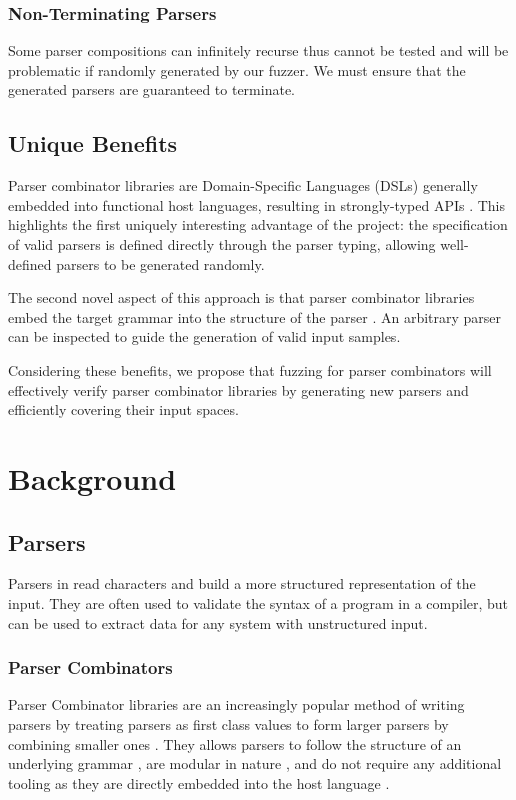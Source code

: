 \documentclass[11pt]{article}
\begin{document}
\subsubsection{Non-Terminating Parsers}
Some parser compositions can infinitely recurse thus cannot be tested and will be problematic if randomly generated by our fuzzer. We must ensure that the generated parsers are guaranteed to terminate.

\subsection{Unique Benefits}
Parser combinator libraries are Domain-Specific Languages (DSLs) generally embedded into functional host languages, resulting in strongly-typed APIs \cite{monadic-combinators, parsec}. This highlights the first uniquely interesting advantage of the project: the specification of valid parsers is defined directly through the parser typing, allowing well-defined parsers to be generated randomly.

The second novel aspect of this approach is that parser combinator libraries embed the target grammar into the structure of the parser \cite{combinator-parsing}. An arbitrary parser can be inspected to guide the generation of valid input samples.

Considering these benefits, we propose that fuzzing for parser combinators will effectively verify parser combinator libraries by generating new parsers and efficiently covering their input spaces.

\section{Background}

\subsection{Parsers}
Parsers in read characters and build a more structured representation of the input. They are often used to validate the syntax of a program in a compiler, but can be used to extract data for any system with unstructured input.

\subsubsection{Parser Combinators}
Parser Combinator libraries are an increasingly popular method of writing parsers by treating parsers as first class values to form larger parsers by combining smaller ones \cite{parsley}. They allows parsers to follow the structure of an underlying grammar \cite{efficient-combinators}, are modular in nature \cite{efficient-combinators}, and do not require any additional tooling as they are directly embedded into the host language \cite{parsec}.
\end{document}

